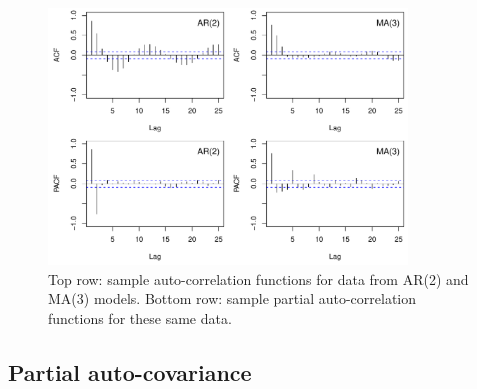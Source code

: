 \documentclass{article}
\begin{document}
\begin{itemize}
\begin{figure}[htb]
\centering
\includegraphics[width=0.85\textwidth]{fig/auto-cor-1.pdf}
\caption{Top row: sample auto-correlation functions for data from AR(2) and
  MA(3) models. Bottom row: sample partial auto-correlation functions for these
  same data.} 
\label{fig:auto-cor}
\end{figure}
\end{itemize}

\subsection{Partial auto-covariance}
\end{document}
